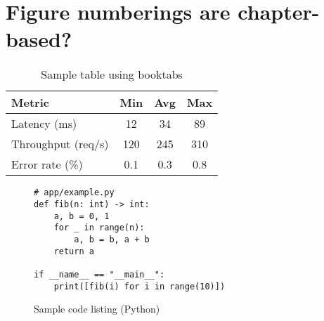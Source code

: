\documentclass{report}
\begin{document}
\chapter{Figure numberings are chapter-based?}

\begin{table}[htbp]
  \centering
  \caption{Sample table using booktabs}\label{tab:metrics}
  \begin{tabular}{@{}lccc@{}}
    \toprule
    Metric & Min & Avg & Max \\
    \midrule
    Latency (ms) & 12 & 34 & 89 \\
    Throughput (req/s) & 120 & 245 & 310 \\
    Error rate (\%) & 0.1 & 0.3 & 0.8 \\
    \bottomrule
  \end{tabular}
\end{table}

\begin{figure}[htbp]
  \centering
  \begin{minipage}{0.9\linewidth}
\begin{verbatim}
# app/example.py
def fib(n: int) -> int:
    a, b = 0, 1
    for _ in range(n):
        a, b = b, a + b
    return a

if __name__ == "__main__":
    print([fib(i) for i in range(10)])
\end{verbatim}
  \end{minipage}
  \caption{Sample code listing (Python)}\label{fig:listing-python}
\end{figure}
\end{document}
